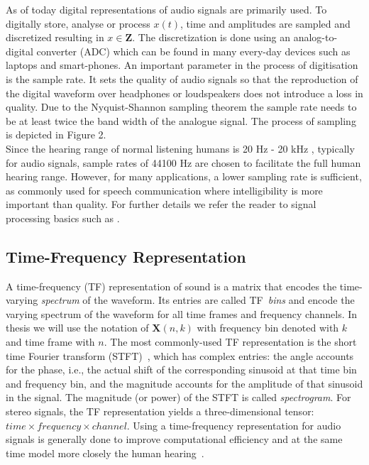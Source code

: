 As of today digital representations of audio signals are primarily used.
To digitally store, analyse or process \(x(t)\), time and amplitudes are sampled and discretized resulting in \(x \in \mathbf{Z}\).
The discretization is done using an analog-to-digital converter (ADC) which can be found in many every-day devices such as laptops and smart-phones.
An important parameter in the process of digitisation is the sample rate.
It sets the quality of audio signals so that the reproduction of the digital waveform over headphones or loudspeakers does not introduce a loss in quality. Due to the Nyquist-Shannon sampling theorem the sample rate needs to be at least twice the band width of the analogue signal.
The process of sampling is depicted in Figure 2.\\

Since the hearing range of normal listening humans is 20 Hz - 20 kHz \cite{fastl90, moore89}, typically for audio signals, sample rates of 44100 Hz are chosen to facilitate the full human hearing range.
However, for many applications, a lower sampling rate is sufficient, as commonly used for speech communication where intelligibility is more important than quality.
For further details we refer the reader to signal processing basics such as \cite{proakis96, oppenheim97}.

\hypertarget{time-frequency-representation}{%
\subsection{Time-Frequency
Representation}\label{time-frequency-representation}}


A time-frequency (TF) representation of sound is a matrix that encodes the time-varying \textit{spectrum} of the waveform. Its entries are called TF~\textit{bins} and encode the varying spectrum of the waveform for all time frames and frequency channels. In thesis we will use the notation of \(\mathbf{X}(n, k)\) with frequency bin denoted with \(k\) and time frame with \(n\).
The most commonly-used TF representation is the short time Fourier transform (STFT)~\cite{mcaulay86}, which has complex entries: the angle accounts for the phase, i.e., the actual shift of the corresponding sinusoid at that time bin and frequency bin, and the magnitude accounts for the amplitude of that sinusoid in the signal.
The magnitude (or power) of the STFT is called \textit{spectrogram}.
For stereo signals, the TF representation yields a three-dimensional tensor: ${time} \times frequency \times channel$.
Using a time-frequency representation for audio signals is generally done to improve computational efficiency and at the same time model more closely
the human hearing~\cite{bregman90}.

